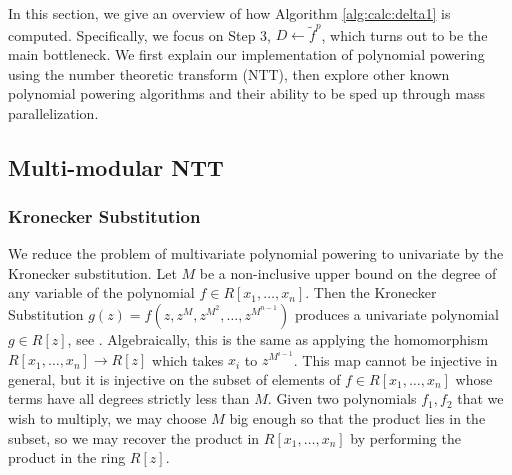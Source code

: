 



In this section, we give an overview of how Algorithm \ref{alg:calc:delta1} is computed. Specifically, we focus on Step 3, \(D \gets \tilde{f}^{p}\), which turns out to be the main bottleneck. We first explain our implementation of polynomial powering using the number theoretic transform (NTT), then explore other known polynomial powering algorithms and their ability to be sped up through mass parallelization.

\subsection{Multi-modular NTT}

\subsubsection{Kronecker Substitution}
We reduce the problem of multivariate polynomial powering to univariate
by the Kronecker substitution.
Let $M$ be a non-inclusive upper bound on the degree of any variable of the polynomial
$f \in R[x_1, \dots, x_n]$. 
Then the Kronecker Substitution 
\(g(z) = f(z, z^M, z^{M^2}, \dots, z^{M^{n-1}})\)
produces a univariate polynomial $g \in R[z]$,
see \cite{arnold-2014-kronecker}.
Algebraically, this is the same as applying the 
homomorphism 
\(R[x_{1}, \ldots, x_{n}] \xrightarrow{} R[z]\)
which takes \(x_{i}\) to
\(z^{M^{i-1}}\).
This map cannot be injective in general, but it
is injective on the subset of elements of
\(f \in R[x_{1}, \ldots, x_{n}]\) 
whose terms have all degrees strictly less than \(M\).
Given two polynomials \(f_{1}, f_{2}\) that
we wish to multiply, we may choose \(M\)
big enough
so that the product lies in the subset,
so we may recover the product in 
\(R[x_{1}, \ldots, x_{n}]\) by performing
the product in the ring \(R[z]\).

